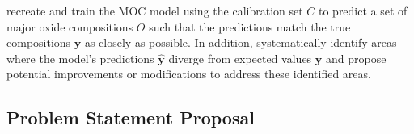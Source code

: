 recreate and train the MOC model using the calibration set $C$ to predict a set of major oxide compositions $O$ such that the predictions match the true compositions $\mathbf{y}$ as closely as possible.
In addition, systematically identify areas where the model's predictions $\mathbf{\hat{y}}$ diverge from expected values $\mathbf{y}$ and propose potential improvements or modifications to address these identified areas.

\subsection{Problem Statement Proposal}







% 
% 


